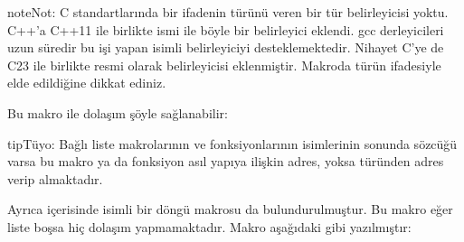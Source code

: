 \documentclass[a4paper,10pt,turkish]{sphinxmanual}
\begin{document}
\begin{sphinxVerbatim}[commandchars=\\\{\}]
\end{sphinxVerbatim}

\begin{sphinxadmonition}{note}{Not:}
\sphinxAtStartPar
C standartlarında bir ifadenin türünü veren bir tür belirleyicisi yoktu. C++’a C++11 ile birlikte
 ismi ile böyle bir belirleyici eklendi. gcc derleyicileri uzun süredir bu işi yapan
 isimli belirleyiciyi desteklemektedir. Nihayet C’ye de C23 ile birlikte resmi olarak
 belirleyicisi eklenmiştir. Makroda türün  ifadesiyle elde edildiğine dikkat
ediniz.
\end{sphinxadmonition}

\sphinxAtStartPar
Bu makro ile dolaşım şöyle sağlanabilir:

\begin{sphinxVerbatim}[commandchars=\\\{\}]

\end{sphinxVerbatim}

\begin{sphinxadmonition}{tip}{Tüyo:}
\sphinxAtStartPar
Bağlı liste makrolarının ve fonksiyonlarının isimlerinin sonunda  sözcüğü varsa bu makro ya da
fonksiyon asıl yapıya ilişkin adres, yoksa  türünden adres verip almaktadır.
\end{sphinxadmonition}

\sphinxAtStartPar
Ayrıca  içerisinde  isimli bir döngü makrosu da
bulundurulmuştur. Bu makro eğer liste boşsa hiç dolaşım yapmamaktadır. Makro aşağıdaki gibi
yazılmıştır:
\end{document}
